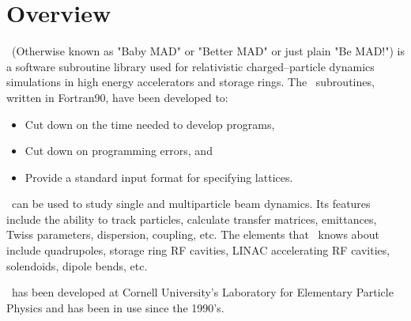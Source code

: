 \section*{Overview}

\bmad\ (Otherwise known as "Baby MAD" or "Better MAD" or just plain "Be MAD!")
is a software subroutine library used for relativistic
charged--particle dynamics simulations in high energy accelerators and
storage rings. The \bmad\ subroutines, written in
Fortran90, have been developed to:
\begin{itemize}
\item Cut down on the time needed to develop programs,
\item Cut down on programming errors, and
\item Provide a standard input format for specifying lattices.
\end{itemize}

\bmad\ can be used to study single and multiparticle beam dynamics. Its 
features include the ability to track particles, calculate transfer matrices,
emittances, Twiss parameters, 
dispersion, coupling, etc. The elements that \bmad\ knows about include
quadrupoles, storage ring RF cavities, LINAC accelerating RF cavities, 
solendoids, dipole bends, etc. 

\bmad\ has been developed at Cornell University's Laboratory for Elementary
Particle Physics and has been in use since the 1990's. 
\vfill
\break

